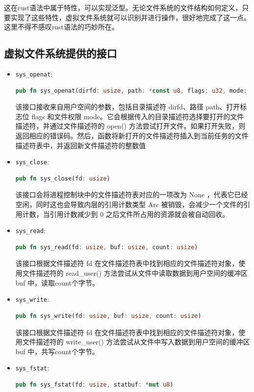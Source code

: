 这在rust语法中属于特性，可以实现泛型。无论文件系统的文件结构如何定义，只要实现了这些特性，虚拟文件系统就可以识别并进行操作，很好地完成了这一点。这里不得不感叹rust语法的巧妙所在。

\subsection{虚拟文件系统提供的接口}

\begin{itemize}
	\item \texttt{sys\_openat}: 
	\begin{lstlisting}[language=rust]
		pub fn sys_openat(dirfd: usize, path: *const u8, flags: u32, mode: u32)
	\end{lstlisting}
	该接口接收来自用户空间的参数，包括目录描述符 dirfd、路径 path、打开标志位 flags 和文件权限 mode。它会根据传入的目录描述符选择要打开的文件描述符，并通过文件描述符的 open() 方法尝试打开文件。如果打开失败，则返回相应的错误码。然后，函数将新打开的文件描述符插入到当前任务的文件描述符表中，并返回新文件描述符的整数值
	\item \texttt{sys\_close}: 
	\begin{lstlisting}[language=rust]
		pub fn sys_close(fd: usize)
	\end{lstlisting}
	该接口会将进程控制块中的文件描述符表对应的一项改为 None ，代表它已经空闲，同时这也会导致内层的引用计数类型 Arc 被销毁，会减少一个文件的引用计数，当引用计数减少到 0 之后文件所占用的资源就会被自动回收。
	\item \texttt{sys\_read}: 
	\begin{lstlisting}[language=rust]
		pub fn sys_read(fd: usize, buf: usize, count: usize)
	\end{lstlisting}
	该接口根据文件描述符 fd 在文件描述符表中找到相应的文件描述符对象，使用文件描述符的 read\_user() 方法尝试从文件中读取数据到用户空间的缓冲区 buf 中，读取count个字节。
	\item \texttt{sys\_write}: 
	\begin{lstlisting}[language=rust]
		pub fn sys_write(fd: usize, buf: usize, count: usize)
	\end{lstlisting}
	该接口根据文件描述符 fd 在文件描述符表中找到相应的文件描述符对象，使用文件描述符的 write\_user() 方法尝试从文件中写入数据到用户空间的缓冲区 buf 中，共写count个字节。
	\item \texttt{sys\_fstat}: 
	\begin{lstlisting}[language=rust]
		pub fn sys_fstat(fd: usize, statbuf: *mut u8)
	\end{lstlisting}

\end{itemize}
